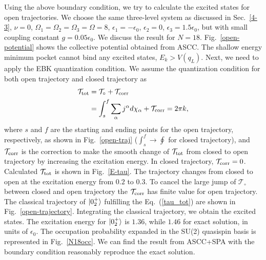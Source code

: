 \documentclass[11pt]{book} %
\begin{document}
Using the above boundary condition, we try to calculate the excited states for open trajectories.  We choose the same three-level system as discussed in Sec.~\ref{4-3}, $\nu=0$,
$\Omega_1=\Omega_2=\Omega_3=\Omega=8$,
$\epsilon_1=-\epsilon_0$, $\epsilon_2=0$, $\epsilon_3=1.5\epsilon_0$,
but with small coupling constant $g=0.05\epsilon_0$. We discuss the result for $N=18$. Fig.~\ref{open-potential} shows the collective potential obtained from ASCC. The shallow energy minimum pocket cannot bind any excited states, $E_k > V(q_L)$. Next, we need to apply the EBK quantization condition. We assume the quantization condition for both open trajectory and closed trajectory as
\begin{align}
  \mathcal{T}_{\rm tot} &= \mathcal{T}_\circ + \mathcal{T}_{\rm corr} \nonumber \\
  &= \int_s^f \sum_\alpha j^\alpha d\chi_\alpha + \mathcal{T}_{\rm corr} = 2\pi k, 
  \label{tau_tot}
\end{align}
where $s$ and $f$ are the starting and ending points for the open trajectory, respectively, as shown in Fig.~\ref{open-traj} ($\int_s^f\to\oint$ for closed trajectory), and $\mathcal{T}_{\rm corr}$ is the correction to make the smooth change of $\mathcal{T}_{\rm tot}$ from closed to open trajectory by increasing the excitation energy. In closed trajectory, $\mathcal{T}_{\rm corr}=0$. Calculated $\mathcal{T}_{\rm tot}$ is shown in Fig.~\ref{E-tau}. The trajectory changes from closed to open at the excitation energy from $0.2$ to $0.3$. To cancel the large jump of $\mathcal{T}_\circ$ between closed and open trajectory the $\mathcal{T}_{\rm corr}$ has finite value for open trajectory. The classical trajectory of $\ket{0_2^+}$ fulfilling the Eq.~(\ref{tau_tot}) are shown in Fig.~\ref{open-trajectory}. Integrating the classical trajectory, we obtain the excited states. The excitation energy for $\ket{0_2^+}$ is $1.36$, while $1.46$ for exact solution, in units of $\epsilon_0$. The occupation probability expanded in the SU(2) quasispin basis is represented in Fig.~\ref{N18occ}. We can find the result from ASCC+SPA with the boundary condition reasonably reproduce the exact solution.
\end{document}
